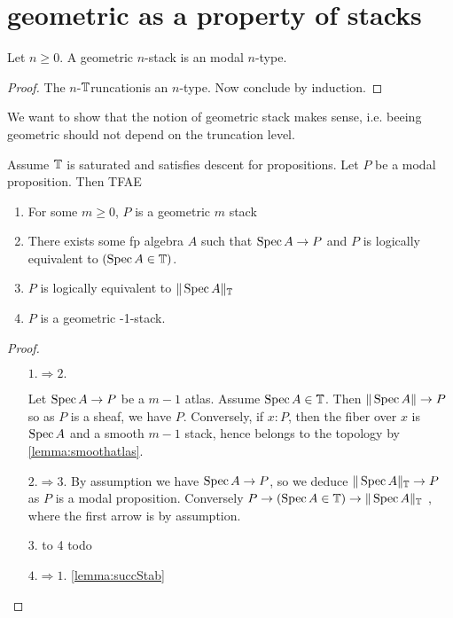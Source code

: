 \documentclass{article}
\newcommand{\truncation}{$\bT$runcation}
\newcommand{\red}[1]{{\color{red} #1}}
\begin{document}
\section{geometric as a property of stacks}


\begin{lemma}
    Let $n \ge 0$. A geometric $n$-stack is an modal $n$-type.
\end{lemma}
\begin{proof}
     The $n$-\truncation is an $n$-type. Now conclude by induction.
\end{proof}
We want to show that the notion of geometric stack makes sense, i.e. beeing geometric should not depend on the truncation level. 

\begin{lemma}{\label{lemma:prop0stacks}}
     Assume $\mathbb{T}$ is saturated and satisfies descent for propositions. Let $P$ be a modal proposition. Then TFAE 
     \begin{enumerate}
         \item For some $m \ge 0$, $P$ is a geometric $m$ stack 
         \item There exists some fp algebra $A$ such that $\operatorname{Spec} A \to P$ and $P$ is logically equivalent to $(\operatorname{Spec} A \in \mathbb{T})$.
         \item $P$ is logically equivalent to $\|\operatorname{Spec} A\|_{\mathbb{T}}$
         \item $P$ is a geometric -1-stack.
     \end{enumerate}
     
     
\end{lemma}
\begin{proof}
\
    \begin{itemize}
        \item[$1.\Rightarrow 2.$]
    
     Let $\operatorname{Spec} A \to P$ be a $m-1$ atlas. Assume $\operatorname{Spec} A \in \mathbb{T}$. Then $\|\operatorname{Spec} A\| \to P$ so as $P$ is a sheaf, we have $P$. Conversely, if $x : P$, then the fiber over $x$ is $\operatorname{Spec} A$ and a smooth $m-1$ stack, hence belongs to the topology by \ref{lemma:smoothatlas}. 
     \item[$2. \Rightarrow 3.$]
        By assumption we have $\operatorname{Spec} A \to P$, so we deduce $\|\operatorname{Spec} A\|_{\mathbb{T}} \to P$ as $P$ is a modal proposition. Conversely $P \to (\operatorname{Spec} A \in \mathbb{T}) \to \|\operatorname{Spec} A\|_{\mathbb{T}}$ , where the first arrow is by assumption.
        \item [3. to 4] todo
        \item [$4. \Rightarrow 1.$] \ref{lemma:succStab}
     \end{itemize}
\end{proof}
\end{document}
